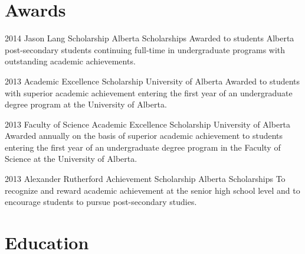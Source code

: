 \documentclass{friggeri-cv} %
\begin{document}

\pagebreak[2]
\section{Awards}

\begin{entrylist}


\entry
{2014}
{Jason Lang Scholarship}
{Alberta Scholarships}
{Awarded to students Alberta post-secondary students continuing full-time in undergraduate programs with outstanding academic achievements.}


\entry
{2013}
{Academic Excellence Scholarship}
{University of Alberta}
{Awarded to students with superior academic achievement entering the first year of an undergraduate degree program at the University of Alberta.}


\entry
{2013}
{Faculty of Science Academic Excellence Scholarship}
{University of Alberta}
{Awarded annually on the basis of superior academic achievement to students entering the first year of an undergraduate degree program in the Faculty of Science at the University of Alberta.}


\entry
{2013}
{Alexander Rutherford Achievement Scholarship}
{Alberta Scholarships}
{To recognize and reward academic achievement at the senior high school level and to encourage students to pursue post-secondary studies.}


\end{entrylist}



\pagebreak[4]
\section{Education}
\end{document}
